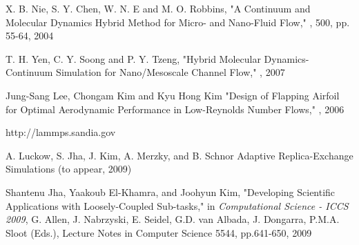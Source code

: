 \documentclass[a4paper]{article}
\begin{document}
\begin{thebibliography}{99}
X. B. Nie, S. Y. Chen, W. N. E and M. O. Robbins,
\newblock "A Continuum and Molecular Dynamics Hybrid Method for Micro- and Nano-Fluid Flow,"
, 500, pp. 55-64, 2004

T. H. Yen, C. Y. Soong and P. Y. Tzeng,
\newblock "Hybrid Molecular Dynamics-Continuum Simulation for Nano/Mesoscale Channel Flow,"
, 2007

Jung-Sang Lee, Chongam Kim and Kyu Hong Kim
\newblock "Design of Flapping Airfoil for Optimal Aerodynamic Performance in Low-Reynolds Number Flows,"
, 2006

http://lammps.sandia.gov

A. Luckow, S. Jha, J. Kim, A. Merzky, and B. Schnor
\newblock Adaptive Replica-Exchange Simulations
 (to appear, 2009)


Shantenu Jha, Yaakoub El-Khamra, and Joohyun Kim,
\newblock "Developing Scientific Applications with Loosely-Coupled Sub-tasks,"
\newblock in {\em Computational Science - ICCS 2009}, G. Allen, J. Nabrzyski, E. Seidel, G.D. van Albada, J. Dongarra, P.M.A. Sloot (Eds.), Lecture Notes in Computer Science 5544, pp.641-650, 2009

\end{thebibliography}

\vspace{12pt}


\end{document}
